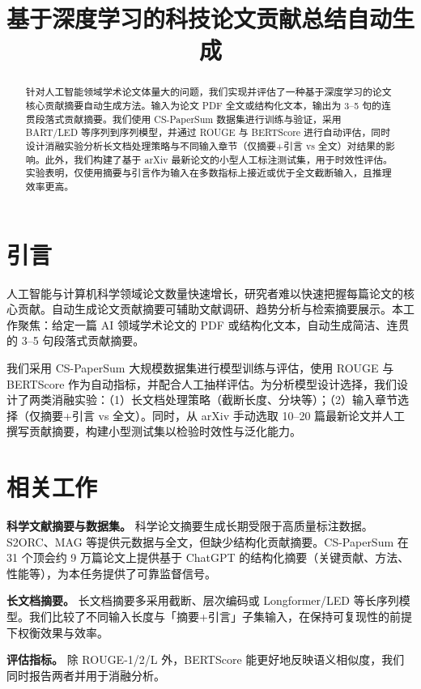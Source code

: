 \documentclass[11pt,a4paper]{article}
\title{基于深度学习的科技论文贡献总结自动生成}
\author{}
\date{}
\begin{document}
\maketitle
\begin{abstract}
针对人工智能领域学术论文体量大的问题，我们实现并评估了一种基于深度学习的论文核心贡献摘要自动生成方法。输入为论文 PDF 全文或结构化文本，输出为 3--5 句的连贯段落式贡献摘要。我们使用 CS-PaperSum 数据集进行训练与验证，采用 BART/LED 等序列到序列模型，并通过 ROUGE 与 BERTScore 进行自动评估，同时设计消融实验分析长文档处理策略与不同输入章节（仅摘要+引言 vs 全文）对结果的影响。此外，我们构建了基于 arXiv 最新论文的小型人工标注测试集，用于时效性评估。实验表明，仅使用摘要与引言作为输入在多数指标上接近或优于全文截断输入，且推理效率更高。
\end{abstract}

\section{引言}
\label{sec:intro}

人工智能与计算机科学领域论文数量快速增长，研究者难以快速把握每篇论文的核心贡献。自动生成论文贡献摘要可辅助文献调研、趋势分析与检索摘要展示。本工作聚焦：给定一篇 AI 领域学术论文的 PDF 或结构化文本，自动生成简洁、连贯的 3--5 句段落式贡献摘要。

我们采用 CS-PaperSum 大规模数据集进行模型训练与评估，使用 ROUGE 与 BERTScore 作为自动指标，并配合人工抽样评估。为分析模型设计选择，我们设计了两类消融实验：（1）长文档处理策略（截断长度、分块等）；（2）输入章节选择（仅摘要+引言 vs 全文）。同时，从 arXiv 手动选取 10--20 篇最新论文并人工撰写贡献摘要，构建小型测试集以检验时效性与泛化能力。

\section{相关工作}
\label{sec:related}

\textbf{科学文献摘要与数据集。} 科学论文摘要生成长期受限于高质量标注数据。S2ORC、MAG 等提供元数据与全文，但缺少结构化贡献摘要。CS-PaperSum 在 31 个顶会约 9 万篇论文上提供基于 ChatGPT 的结构化摘要（关键贡献、方法、性能等），为本任务提供了可靠监督信号。

\textbf{长文档摘要。} 长文档摘要多采用截断、层次编码或 Longformer/LED 等长序列模型。我们比较了不同输入长度与「摘要+引言」子集输入，在保持可复现性的前提下权衡效果与效率。

\textbf{评估指标。} 除 ROUGE-1/2/L 外，BERTScore 能更好地反映语义相似度，我们同时报告两者并用于消融分析。
\end{document}
